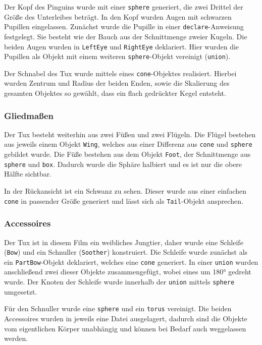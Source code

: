 \documentclass[11pt,parskip]{scrartcl}
\begin{document}
Der Kopf des Pinguins wurde mit einer \texttt{sphere} generiert, die zwei Drittel
der Größe des Unterleibes beträgt. In den Kopf wurden Augen mit schwarzen Pupillen
eingelassen. Zunächst wurde die Pupille in einer \texttt{declare}-Anweisung
festgelegt. Sie besteht wie der Bauch aus der Schnittmenge zweier Kugeln. Die
beiden Augen wurden in \texttt{LeftEye} und \texttt{RightEye} deklariert. Hier
wurden die Pupillen als Objekt mit einem weiteren \texttt{sphere}-Objekt
vereinigt (\texttt{union}).

Der Schnabel des Tux wurde mittels eines \texttt{cone}-Objektes realisiert.
Hierbei wurden Zentrum und Radius der beiden Enden, sowie die Skalierung des
gesamten Objektes so gewählt, dass ein flach gedrückter Kegel entsteht.

\subsubsection{Gliedmaßen}
Der Tux besteht weiterhin aus zwei Füßen und zwei Flügeln. Die Flügel bestehen
aus jeweils einem Objekt \texttt{Wing}, welches aus einer Differenz aus
\texttt{cone} und \texttt{sphere} gebildet wurde. Die Füße bestehen aus dem
Objekt \texttt{Foot}, der Schnittmenge aus \texttt{sphere} und \texttt{box}.
Dadurch wurde die Sphäre halbiert und es ist nur die obere Hälfte sichtbar.

In der Rückansicht ist ein Schwanz zu sehen. Dieser wurde aus einer einfachen
\texttt{cone} in passender Größe generiert und lässt sich als
\texttt{Tail}-Objekt ansprechen.

\subsubsection{Accessoires}
Der Tux ist in diesem Film ein weibliches Jungtier, daher wurde eine Schleife
(\texttt{Bow}) und ein Schnuller (\texttt{Soother}) konstruiert. Die Schleife
wurde zunächst als ein \texttt{PartBow}-Objekt deklariert, welches eine
\texttt{cone} generiert. In einer \texttt{union} wurden anschließend zwei dieser
Objekte zusammengefügt, wobei eines um \ang{180} gedreht wurde. Der Knoten der
Schleife wurde innerhalb der \texttt{union} mittels \texttt{sphere} umgesetzt.

Für den Schnuller wurde eine \texttt{sphere} und ein \texttt{torus} vereinigt.
Die beiden Accessoires wurden in jeweils eine Datei ausgelagert, dadurch sind
die Objekte vom eigentlichen Körper unabhängig und können bei Bedarf auch
weggelassen werden.
\end{document}
